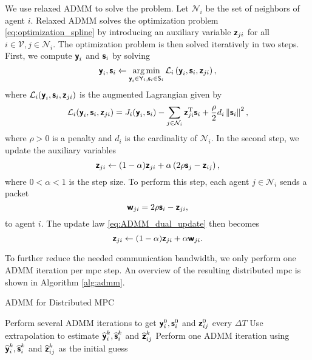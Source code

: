 We use relaxed ADMM \cite{bastianello_asynchronous_2021} to solve the problem.
Let $\mathcal{N}_i$ be the set of neighbors of agent $i$.
Relaxed ADMM solves the optimization problem \eqref{eq:optimization_spline} by introducing an auxiliary variable $\boldsymbol{\mathsf{z}}_{ji}$ for all $i \in \mathcal{V}, j \in \mathcal{N}_i$.
The optimization problem is then solved iteratively in two steps.
First, we compute $\boldsymbol{\mathsf{y}}_i$ and $\boldsymbol{\mathsf{s}}_i$ by solving
\begin{equation}
    \boldsymbol{\mathsf{y}}_i, \boldsymbol{\mathsf{s}}_i
    \leftarrow
    \operatorname*{arg\,min}_{\boldsymbol{\mathsf{y}}_i \in \mathsf{Y}_i, \boldsymbol{\mathsf{s}}_i \in \mathsf{S}_i}
    \mathcal{L}_i
    \left(
        \boldsymbol{\mathsf{y}}_i, \boldsymbol{\mathsf{s}}_i, \boldsymbol{\mathsf{z}}_{ji}
    \right), \label{eq:ADMM_primal_update}
\end{equation}
where $\mathcal{L}_i(\boldsymbol{\mathsf{y}}_i, \boldsymbol{\mathsf{s}}_i, \boldsymbol{\mathsf{z}}_{ji})$ is the augmented Lagrangian given by
\begin{equation}
    \mathcal{L}_i(\boldsymbol{\mathsf{y}}_i, \boldsymbol{\mathsf{s}}_i, \boldsymbol{\mathsf{z}}_{ji}) = J_i(\boldsymbol{\mathsf{y}}_i, \boldsymbol{\mathsf{s}}_i) - \sum_{j \in \mathcal{N}_i} \boldsymbol{\mathsf{z}}_{ji}^{\mathrm{T}}\boldsymbol{\mathsf{s}}_i + \frac{\rho}{2}d_i\left\|\boldsymbol{\mathsf{s}}_i\right\|^2,
\end{equation}
where $\rho > 0$ is a penalty and $d_i$ is the cardinality of $\mathcal{N}_i$.
In the second step, we update the auxiliary variables
\begin{equation}
    \boldsymbol{\mathsf{z}}_{ji} \leftarrow (1 - \alpha) \boldsymbol{\mathsf{z}}_{ji} + \alpha \left(2\rho\boldsymbol{\mathsf{s}}_j - \boldsymbol{\mathsf{z}}_{ij}\right), \label{eq:ADMM_dual_update}
\end{equation}
where $0 < \alpha < 1$ is the step size. To perform this step, each agent $j \in \mathcal{N}_i$ sends a packet
\begin{equation}
    \boldsymbol{\mathsf{w}}_{ji} = 2\rho\boldsymbol{\mathsf{s}}_i - \boldsymbol{\mathsf{z}}_{ji}, \label{eq:ADMM_packet}
\end{equation}
to agent $i$. The update law \eqref{eq:ADMM_dual_update} then becomes
\begin{equation}
    \boldsymbol{\mathsf{z}}_{ji} \leftarrow (1 - \alpha) \boldsymbol{\mathsf{z}}_{ji} + \alpha \boldsymbol{\mathsf{w}}_{ji}. \label{eq:ADMM_dual_update_packet}
\end{equation} 

To further reduce the needed communication bandwidth, we only perform one ADMM iteration per \gls{mpc} step. An overview of the resulting distributed \gls{mpc} is shown in Algorithm \ref{alg:admm}.

\begin{algorithm}[b]
    \caption{ADMM for Distributed MPC}\label{alg:admm}
    \begin{algorithmic}[1]
         Perform several ADMM iterations to get $\boldsymbol{\mathsf{y}}_i^0, \boldsymbol{\mathsf{s}}_i^0$ and $\boldsymbol{\mathsf{z}}_{ij}^0$
         every $\Delta T$
            \State Use extrapolation to estimate $\widehat{\boldsymbol{\mathsf{y}}}_i^k, \widehat{\boldsymbol{\mathsf{s}}}_i^k$ and $\widehat{\boldsymbol{\mathsf{z}}}_{ij}^k$
            \State Perform one ADMM iteration using $\widehat{\boldsymbol{\mathsf{y}}}_i^k, \widehat{\boldsymbol{\mathsf{s}}}_i^k$ and $\widehat{\boldsymbol{\mathsf{z}}}_{ij}^k$ as the initial guess
        \EndFor
    \end{algorithmic}
\end{algorithm}



